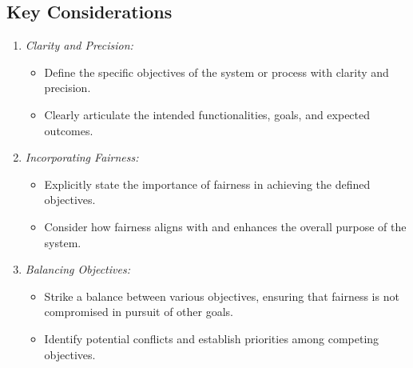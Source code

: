 \documentclass[12pt,a4paper,openright,twoside]{book}
\begin{document}
\subsection{Key Considerations}

\begin{enumerate}

    \item \emph{Clarity and Precision:}

        \begin{itemize}

            \item Define the specific objectives of the system or process with clarity and precision.
            
            \item Clearly articulate the intended functionalities, goals, and expected outcomes.
        
        \end{itemize}
    
    \item \emph{Incorporating Fairness:}

        \begin{itemize}
            
            \item Explicitly state the importance of fairness in achieving the defined objectives.
            
            \item Consider how fairness aligns with and enhances the overall purpose of the system.
        
        \end{itemize}
    
    \item \emph{Balancing Objectives:}

        \begin{itemize}
            
            \item Strike a balance between various objectives, ensuring that fairness is not compromised in pursuit of other goals.
            
            \item Identify potential conflicts and establish priorities among competing objectives.
        
        \end{itemize}

\end{enumerate}
\end{document}
